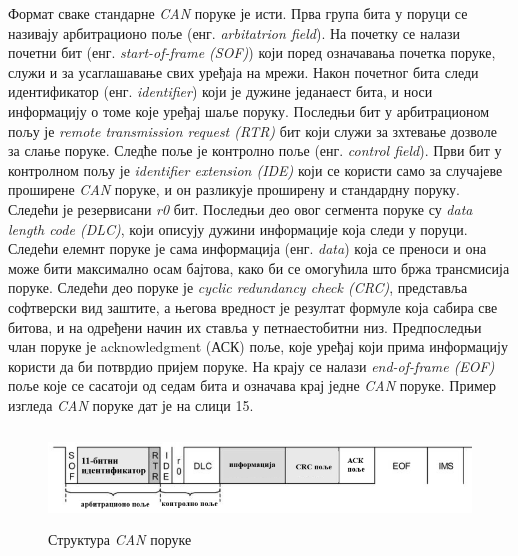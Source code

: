 \documentclass{article}
\begin{document}
Формат сваке стандарне \textit{CAN} поруке је исти. Прва група бита у поруци се називају арбитрационо поље (енг. \textit{arbitatrion field}). На почетку се налази почетни бит (енг. \textit{start-of-frame (SOF)}) који поред означавања почетка поруке, служи и за усаглашавање свих уређаја на мрежи. Након почетног бита следи идентификатор (енг. \textit{identifier}) који је дужине једанаест бита, и носи информацију о томе које уређај шаље поруку. Последњи бит у арбитрационом пољу је \textit{remote transmission request (RTR)} бит који служи за зхтевање дозволе за слање поруке. Следће поље је контролно поље (енг. \textit{control field}). Први бит у контролном пољу је \textit{identifier extension (IDE)} који се користи само за случајеве проширене \textit{CAN} поруке, и он разликује проширену и стандардну поруку. Следећи је резервисани \textit{r0} бит. Последњи део овог сегмента поруке су \textit{data length code (DLC)}, који описују дужини информације која следи у поруци. Следећи елемнт поруке је сама информација (енг. \textit{data}) која се преноси и она може бити максимално осам бајтова, како би се омогућила што бржа трансмисија поруке. Следећи део поруке је \textit{cyclic redundancy check (CRC)}, представља софтверски вид заштите, а његова вредност је резултат формуле која сабира све битова, и на одређени начин их ставља у петнаестобитни низ. Предпоследњи члан поруке је acknowledgment (АСК) поље, које уређај који прима информацију користи да би потврдио пријем поруке. На крају се налази \textit{end-of-frame (EOF)} поље које се сасатоји од седам бита и означава крај једне \textit{CAN} поруке. Пример изгледа \textit{CAN} поруке дат је на слици 15.
\begin{figure}[H]
\centering
\includegraphics[height=1in]{Images/CAN_msg.png }
\caption{Структура \textit{CAN} поруке}
\label{fig:figure15}
\end{figure}
\end{document}
